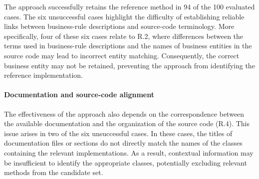 The approach successfully retains the reference method in 94 of the 100 evaluated cases. The six unsuccessful cases highlight the difficulty of establishing reliable links between business-rule descriptions and source-code terminology. More specifically, four of these six cases relate to R.2, where differences between the terms used in business-rule descriptions and the names of business entities in the source code may lead to incorrect entity matching. Consequently, the correct business entity may not be retained, preventing the approach from identifying the reference implementation.

\paragraph{Documentation and source-code alignment}\noindent

The effectiveness of the approach also depends on the correspondence between the available documentation and the organization of the source code (R.4). This issue arises in two of the six unsuccessful cases. In these cases, the titles of documentation files or sections do not directly match the names of the classes containing the relevant implementations. As a result, contextual information may be insufficient to identify the appropriate classes, potentially excluding relevant methods from the candidate set.